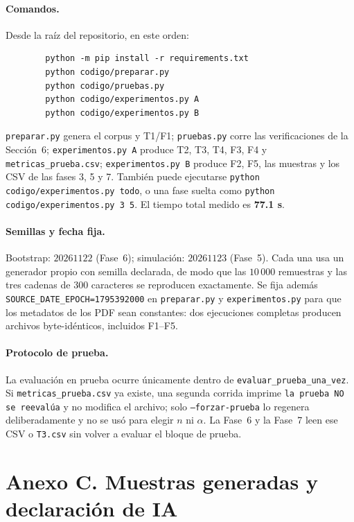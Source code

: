 \documentclass[11pt,letterpaper]{article}
\begin{document}
	\paragraph{Comandos.}
	Desde la raíz del repositorio, en este orden:
	
	\begin{verbatim}
		python -m pip install -r requirements.txt
		python codigo/preparar.py
		python codigo/pruebas.py
		python codigo/experimentos.py A
		python codigo/experimentos.py B
	\end{verbatim}
	
	\texttt{preparar.py} genera el corpus y T1/F1; \texttt{pruebas.py} corre las verificaciones de la Sección~6; \texttt{experimentos.py A} produce T2, T3, T4, F3, F4 y \texttt{metricas\_prueba.csv}; \texttt{experimentos.py B} produce F2, F5, las muestras y los CSV de las fases 3, 5 y 7. También puede ejecutarse \texttt{python codigo/experimentos.py todo}, o una fase suelta como \texttt{python codigo/experimentos.py 3 5}. El tiempo total medido es \textbf{77.1 s}.
	
	\paragraph{Semillas y fecha fija.}
	Bootstrap: $20261122$ (Fase~6); simulación: $20261123$ (Fase~5). Cada una usa un generador propio con semilla declarada, de modo que las $10\,000$ remuestras y las tres cadenas de 300 caracteres se reproducen exactamente. Se fija además \texttt{SOURCE\_DATE\_EPOCH=1795392000} en \texttt{preparar.py} y \texttt{experimentos.py} para que los metadatos de los PDF sean constantes: dos ejecuciones completas producen archivos byte-idénticos, incluidos F1--F5.
	
	\paragraph{Protocolo de prueba.}
	La evaluación en prueba ocurre únicamente dentro de \texttt{evaluar\_prueba\_una\_vez}. Si \texttt{metricas\_prueba.csv} ya existe, una segunda corrida imprime \texttt{la prueba NO se reevalúa} y no modifica el archivo; solo \texttt{--forzar-prueba} lo regenera deliberadamente y no se usó para elegir $n$ ni $\alpha$. La Fase~6 y la Fase~7 leen ese CSV o \texttt{T3.csv} sin volver a evaluar el bloque de prueba.
	
	\section*{Anexo C. Muestras generadas y declaración de IA}
	
\end{document}
